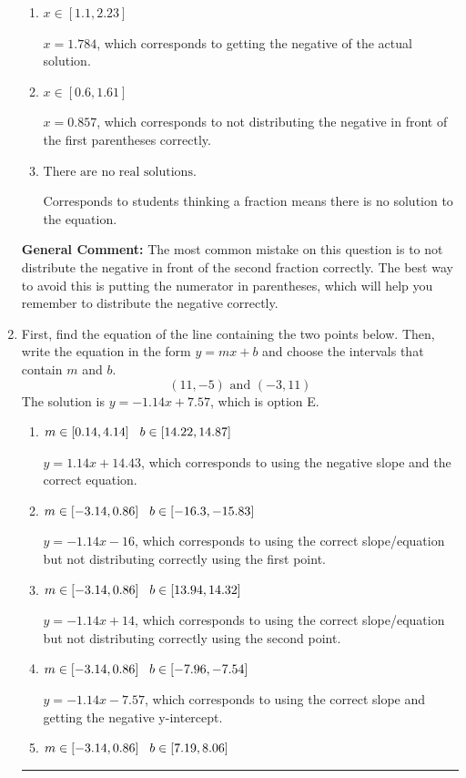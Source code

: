 \documentclass{extbook}[14pt]
\newcommand{\litem}[1]{\item #1

\rule{\textwidth}{0.4pt}}
\begin{document}
\begin{enumerate}
{\begin{enumerate}[label=\Alph*.]
* $x = 0.468$, which is the correct option.
\item \( x \in [1.1, 2.23] \)

$x = 1.784$, which corresponds to getting the negative of the actual solution.
\item \( x \in [0.6, 1.61] \)

$x = 0.857$, which corresponds to not distributing the negative in front of the first parentheses correctly.
\item \( \text{There are no real solutions.} \)

Corresponds to students thinking a fraction means there is no solution to the equation.
\end{enumerate}

\textbf{General Comment:} The most common mistake on this question is to not distribute the negative in front of the second fraction correctly. The best way to avoid this is putting the numerator in parentheses, which will help you remember to distribute the negative correctly.
}
\litem{
First, find the equation of the line containing the two points below. Then, write the equation in the form $ y=mx+b $ and choose the intervals that contain $m$ and $b$.
\[ (11, -5) \text{ and } (-3, 11) \]The solution is \( y = -1.14x + 7.57 \), which is option E.\begin{enumerate}[label=\Alph*.]
\item \( m \in [0.14, 4.14] \hspace*{3mm} b \in [14.22, 14.87] \)

 $y = 1.14x + 14.43$, which corresponds to using the negative slope and the correct equation.
\item \( m \in [-3.14, 0.86] \hspace*{3mm} b \in [-16.3, -15.83] \)

 $y = -1.14x -16$, which corresponds to using the correct slope/equation but not distributing correctly using the first point.
\item \( m \in [-3.14, 0.86] \hspace*{3mm} b \in [13.94, 14.32] \)

 $y = -1.14x + 14$, which corresponds to using the correct slope/equation but not distributing correctly using the second point.
\item \( m \in [-3.14, 0.86] \hspace*{3mm} b \in [-7.96, -7.54] \)

 $y = -1.14x -7.57$, which corresponds to using the correct slope and getting the negative y-intercept.
\item \( m \in [-3.14, 0.86] \hspace*{3mm} b \in [7.19, 8.06] \)


\end{enumerate}}
\end{enumerate}
\end{document}
